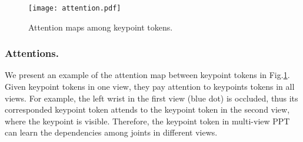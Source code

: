 \documentclass[runningheads]{llncs}
\begin{document}
\begin{figure}[t]
    \centering
    \texttt{[image: attention.pdf]}
    \caption{\small{Attention maps among keypoint tokens. } }
    \label{fig:attention_keypoint}
\end{figure}



\vspace{-0.5em}
\subsubsection{Attentions. }
We present an example of the attention map between keypoint tokens in Fig.\ref{fig:attention_keypoint}. 
Given keypoint tokens in one view, they pay attention to keypoints tokens in all views. For example, the left wrist in the first view (blue dot) is occluded, thus its corresponded keypoint token attends to the keypoint token in the second view, where the keypoint is visible.    
Therefore, the keypoint token in multi-view PPT can learn the dependencies among joints in different views. 




\vspace{-0.5em}
\end{document}
